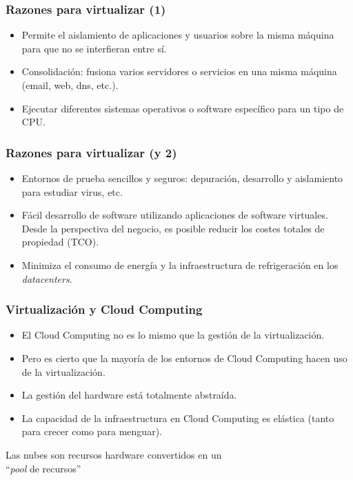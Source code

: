 \documentclass{beamer}
\begin{document}
\begin{frame}
\frametitle{Razones para virtualizar (1)}

\begin{itemize}
\item Permite el \alert{aislamiento} de aplicaciones y usuarios sobre la misma máquina para que no se interfieran entre sí.
\item \alert{Consolidación}: fusiona varios servidores o servicios en una misma máquina (email, web, dns, etc.).
\item Ejecutar diferentes sistemas operativos o software específico para un tipo de CPU.
\end{itemize}

\end{frame}


\begin{frame}
\frametitle{Razones para virtualizar (y 2)}

\begin{itemize}
\item \alert{Entornos de prueba} sencillos y seguros: depuración, desarrollo y aislamiento para estudiar virus, etc.
\item \alert{Fácil desarrollo} de software utilizando aplicaciones de software virtuales. Desde la perspectiva del negocio, es posible reducir los costes totales de propiedad (TCO).
\item \alert{Minimiza el consumo de energía} y la infraestructura de refrigeración en los \textit{datacenters}.
\end{itemize}

\end{frame}




\begin{frame}
\frametitle{Virtualización y Cloud Computing}

\begin{itemize}
\item El Cloud Computing \alert{no} es lo mismo que la gestión de la virtualización.
\item Pero es cierto que la mayoría de los entornos de Cloud Computing hacen uso de la virtualización.
\item La gestión del hardware está totalmente abstraída.
\item La capacidad de la infraestructura en Cloud Computing es elástica (tanto para crecer como para menguar).
\end{itemize}

\begin{center}
\alert{Las nubes son recursos hardware convertidos en un \\ ``\textit{pool} de recursos''}
\end{center}


\end{frame}
\end{document}
